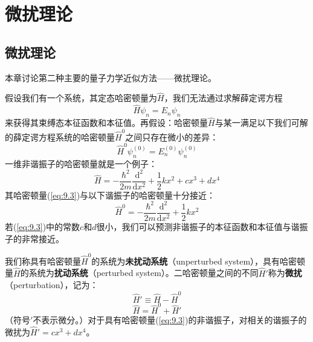 \chapter{微扰理论}
\label{chap:9}
\section{微扰理论}
\label{sec:9.1 Perturbation Theory}
    本章讨论第二种主要的量子力学近似方法——微扰理论。

    假设我们有一个系统，其定态哈密顿量为$\hat{H}$，我们无法通过求解薛定谔方程
    \begin{equation}
        \hat{H} \psi_n = E_n \psi_n
        \label{eq:9.1}
    \end{equation}
    来获得其束缚态本征函数和本征值。再假设：哈密顿量$\hat{H}$与某一满足以下我们可解的薛定谔方程系统的哈密顿量$\hat{H}^0$之间只存在微小的差异：
    \begin{equation}
        \hat{H}^0 \psi_n^{\left(0\right)} = E_n^{\left(0\right)} \psi_n^{\left(0\right)}
        \label{eq:9.2}
    \end{equation}
    一维非谐振子的哈密顿量就是一个例子：
    \begin{equation}
        \hat{H} = -\frac{\hbar^2}{2m} \frac{\mathrm{d}^2}{\mathrm{d}x^2} + \frac{1}{2}kx^2 + cx^3 + dx^4
        \label{eq:9.3}
    \end{equation}
    其哈密顿量(\ref{eq:9.3})与以下谐振子的哈密顿量十分接近：
    \begin{equation}
        \hat{H}^0 = -\frac{\hbar^2}{2m} \frac{\mathrm{d}^2}{\mathrm{d}x^2} + \frac{1}{2}kx^2
        \label{eq:9.4}
    \end{equation}
    若(\ref{eq:9.3})中的常数$c$和$d$很小，我们可以预测非谐振子的本征函数和本征值与谐振子的非常接近。

    我们称具有哈密顿量$\hat{H}^0$的系统为\textbf{未扰动系统}（unperturbed system），具有哈密顿量$\hat{H}$的系统为\textbf{扰动系统}（perturbed system）。二哈密顿量之间的不同$\hat{H}'$称为\textbf{微扰}（perturbation），记为：
    \begin{equation}
        \hat{H}' \equiv \hat{H} - \hat{H}^0
        \label{eq:9.5}
    \end{equation}
    \begin{equation}
        \boxed{
        \hat{H} = \hat{H}^0 + \hat{H}'
        }
        \label{eq:9.6}
    \end{equation}
    （符号$\prime$不表示微分。）对于具有哈密顿量(\ref{eq:9.3})的非谐振子，对相关的谐振子的微扰为$\hat{H}' = cx^3 + dx^4$。

